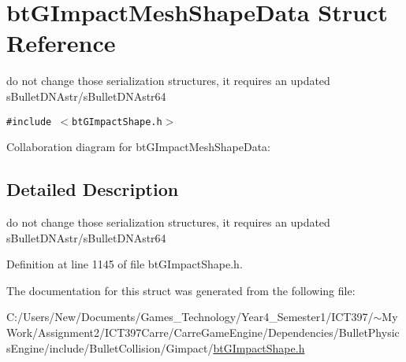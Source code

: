 \hypertarget{structbt_g_impact_mesh_shape_data}{
\section{btGImpactMeshShapeData Struct Reference}
\label{structbt_g_impact_mesh_shape_data}
}
do not change those serialization structures, it requires an updated sBulletDNAstr/sBulletDNAstr64  


{\tt \#include $<$btGImpactShape.h$>$}

Collaboration diagram for btGImpactMeshShapeData:

\subsection{Detailed Description}
do not change those serialization structures, it requires an updated sBulletDNAstr/sBulletDNAstr64 

Definition at line 1145 of file btGImpactShape.h.

The documentation for this struct was generated from the following file:\begin{CompactItemize}
\item 
C:/Users/New/Documents/Games\_\-Technology/Year4\_\-Semester1/ICT397/$\sim$My Work/Assignment2/ICT397Carre/CarreGameEngine/Dependencies/BulletPhysicsEngine/include/BulletCollision/Gimpact/\hyperlink{bt_g_impact_shape_8h}{btGImpactShape.h}\end{CompactItemize}
